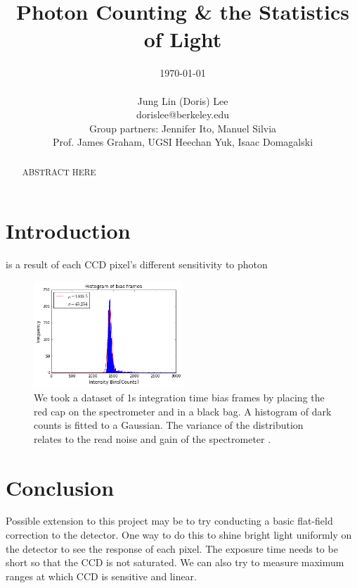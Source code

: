 \documentclass[authoryear, 12pt,5p, times]{elsarticle}
\begin{document}
\begin{frontmatter}
\title{Photon Counting \& the Statistics of Light}
\author{\today \\ \quad \\Jung Lin (Doris) Lee\\ dorislee@berkeley.edu\\Group partners: Jennifer Ito, Manuel Silvia\\Prof. James Graham, UGSI Heechan Yuk, Isaac Domagalski}
	\begin{abstract}
	ABSTRACT HERE
	\end{abstract}
\end{frontmatter}
\section{Introduction\label{intro}}
is a result of each CCD pixel's different sensitivity to photon
\begin{figure}
\includegraphics[width=0.5\textwidth]{figures/bias_histo}
\caption{We took a dataset of 1s integration time bias frames by placing the red cap on the spectrometer and in a black bag. A histogram of dark counts is fitted to a Gaussian. The variance of the distribution relates to the read noise and gain of the spectrometer \citep{ccd_handbook}.}
\end{figure}
\section{Conclusion}

Possible extension to this project may be to try conducting a basic flat-field correction to the detector. One way to do this to shine bright light uniformly on the detector to see the response of each pixel.  The exposure time needs to be short so that the CCD is not saturated. We can also try to measure maximum ranges at which CCD is sensitive and linear.

%
%
%

\end{document}
